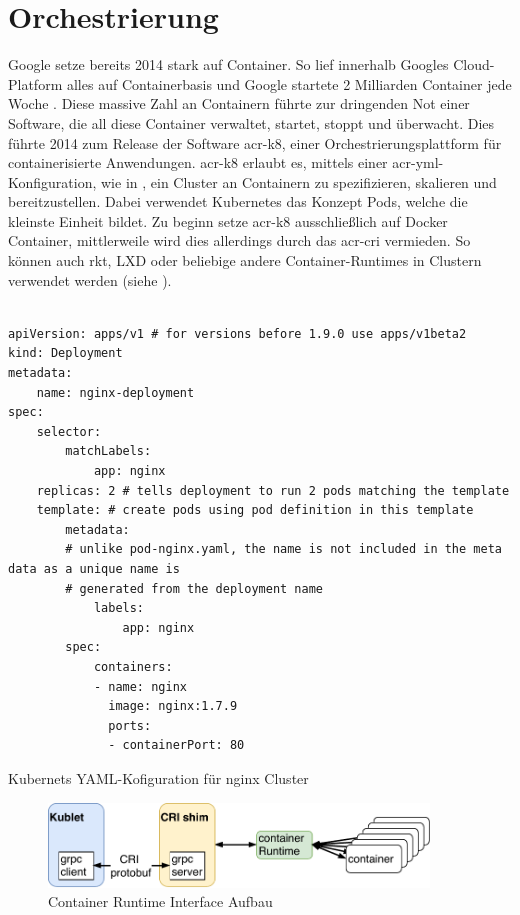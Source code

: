 \section{Orchestrierung}
\label{sec:aktuellesOrchestrierung}


Google setze bereits 2014 stark auf Container. So lief innerhalb Googles Cloud-Platform alles auf Containerbasis und Google startete 2 Milliarden Container jede Woche \citep{ContainersatScale}. Diese massive Zahl an Containern führte zur dringenden Not einer Software, die all diese Container verwaltet, startet, stoppt und überwacht. Dies führte 2014 zum Release der Software \gls{acr-k8}, einer Orchestrierungsplattform für containerisierte Anwendungen. \gls{acr-k8} erlaubt es, mittels einer \gls{acr-yml}-Konfiguration, wie in , ein Cluster an Containern zu spezifizieren, skalieren und bereitzustellen. Dabei verwendet Kubernetes das Konzept Pods, welche die kleinste Einheit bildet. Zu beginn setze \gls{acr-k8} ausschließlich auf Docker Container, mittlerweile wird dies allerdings durch das \gls{acr-cri} vermieden. So können auch rkt, LXD oder beliebige andere Container-Runtimes in Clustern verwendet werden (siehe ).

\begin{listing}[hp]
	\begin{verbatim}

apiVersion: apps/v1 # for versions before 1.9.0 use apps/v1beta2
kind: Deployment
metadata:
    name: nginx-deployment
spec:
    selector:
        matchLabels:
            app: nginx
    replicas: 2 # tells deployment to run 2 pods matching the template
    template: # create pods using pod definition in this template
        metadata:
        # unlike pod-nginx.yaml, the name is not included in the meta data as a unique name is
        # generated from the deployment name
            labels:
                app: nginx
        spec:
            containers:
            - name: nginx
              image: nginx:1.7.9
              ports:
              - containerPort: 80
	\end{verbatim}
	\caption{Kubernets YAML-Kofiguration für nginx Cluster \citep{KubernetesDocumentation}}
	\label{lst:k8yaml}
\end{listing}

\begin{figure}[h]
	\begin{center}
		\includegraphics[width=0.9\textwidth]{bilder/cri.pdf}
		\caption{Container Runtime Interface Aufbau \citep{KubernetesDocumentation}}
		\label{fig:k8cri}
	\end{center}
\end{figure}

